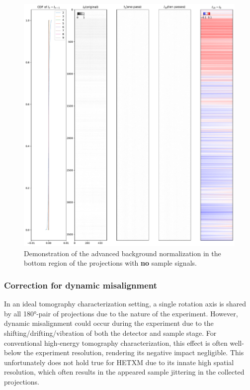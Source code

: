 \documentclass[12pt]{scrartcl}
\newcommand{\myscale}{1}
\begin{document}
\begin{figure}
\centering
\includegraphics[scale=\myscale]{sinogramNormalization_bottom}
\caption{
Demonstration of the advanced background normalization in the bottom region of the projections with \textbf{no} sample signals.
}\label{fig: sino norm bot}
\end{figure}


\subsubsection{
Correction for dynamic misalignment
}\label{sec: correct dynamic misalignment}

In an ideal tomography characterization setting, a single rotation axis is shared by all \ang{180}-pair of projections due to the nature of the experiment.
However, dynamic misalignment could occur during the experiment due to the shifting/drifting/vibration of both the detector and sample stage.
For conventional high-energy tomography characterization, this effect is often well-below the experiment resolution, rendering its negative impact negligible.
This unfortunately does not hold true for HETXM due to its innate high spatial resolution, which often results in the appeared sample jittering in the collected projections.
\end{document}
